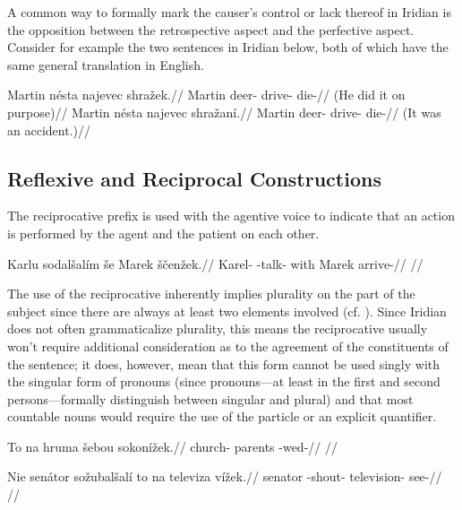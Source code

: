A common way to formally mark the causer's control or lack thereof in Iridian is the opposition between the retrospective aspect and the perfective aspect. Consider for example the two sentences in Iridian below, both of which have the same general translation in English.

\pex
\a
\begingl
	\gla Martin n\'esta najevec shra\v{z}ek.//
	\glb Martin deer- drive- die-//
	\glft {} (He did it on purpose)//
\endgl
\a
\begingl
	\gla Martin n\'esta najevec shra\v{z}an\'i.//
	\glb Martin deer- drive- die-//
	\glft {} (It was an accident.)//
\endgl
\xe

\subsection{Reflexive and Reciprocal Constructions}

The reciprocative prefix  is used with the agentive voice to indicate that an action is performed by the agent and the patient on each other.

\pex
\begingl
\gla Karlu sodal\v{s}al\'im \v{s}e Marek \v{s}\v{c}en\v{z}ek.//
\glb Karel- -talk- with Marek arrive-//
\glft {}//
\endgl
\xe

The use of the reciprocative inherently implies plurality on the part of the subject since there are always at least two elements involved (cf. \cite[255]{tesniere1965}). Since Iridian does not often grammaticalize plurality, this means the reciprocative usually won't require additional consideration as to the agreement of the constituents of the sentence; it does, however, mean that this form cannot be used singly with the singular form of pronouns (since pronouns---at least in the first and second persons---formally distinguish between singular and plural) and that most countable nouns would require the use of the particle  or an explicit quantifier.

\pex
\begingl
\gla To na hruma \v{s}ebou sokon\'i\v{z}ek.//
\glb {}  church- parents -wed-//
\glft {}//
\endgl
\xe

\pex
\begingl
\gla Nie sen\'ator so\v{z}ubal\v{s}al\'i to na televiza v\'i\v{z}ek.//
\glb {} senator -shout-   television- see-//
\glft {}//
\endgl
\xe

